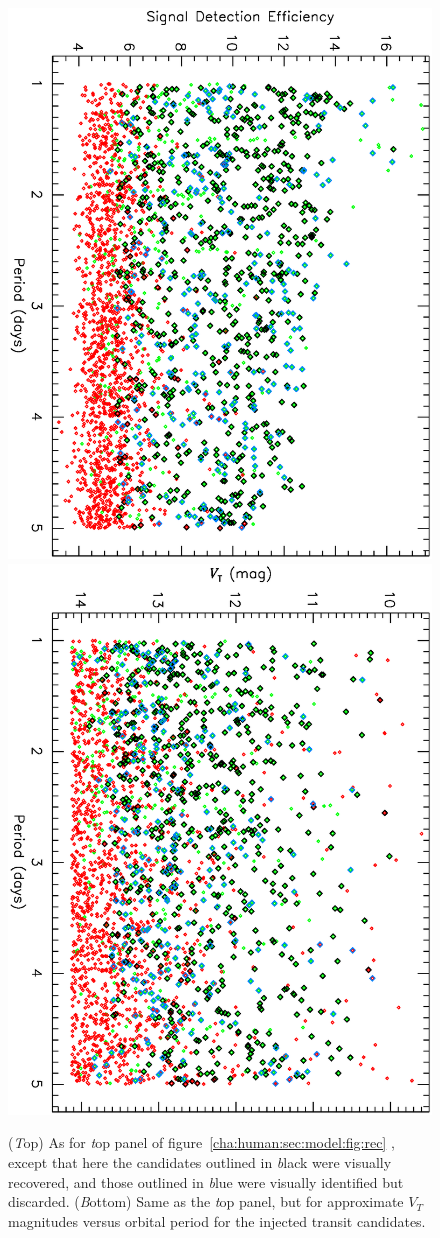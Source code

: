 \begin{figure}
\begin{center}
\centering
\includegraphics[width=.55\textwidth, angle=90]{7_visual_b} \\
\includegraphics[width=.55\textwidth, angle=90]{7_visual_a} \\
\caption[SDE and $V_{T}$ versus period for visually recovered transits]{%
({\textit Top}) As for {\textit top panel} of figure~\ref{cha:human:sec:model:fig:rec}%
, except that here the candidates outlined in {\textit black} were visually recovered, and those outlined in {\textit blue} were visually identified but discarded.
({\textit Bottom}) Same as the {\textit top panel}, but for approximate $V_{T}$ magnitudes versus orbital period for the injected transit candidates.%
}\label{cha:human:sec:model:fig:visrec}
\end{center}
\end{figure}

